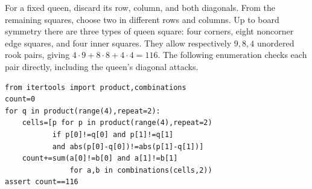 For a fixed queen, discard its row, column, and both diagonals. From the remaining squares, choose two in different rows and columns. Up to board symmetry there are three types of queen square: four corners, eight noncorner edge squares, and four inner squares. They allow respectively $9,8,4$ unordered rook pairs, giving $4\cdot9+8\cdot8+4\cdot4=\boxed{116}$. The following enumeration checks each pair directly, including the queen's diagonal attacks.\begin{verbatim}
from itertools import product,combinations
count=0
for q in product(range(4),repeat=2):
    cells=[p for p in product(range(4),repeat=2)
           if p[0]!=q[0] and p[1]!=q[1]
           and abs(p[0]-q[0])!=abs(p[1]-q[1])]
    count+=sum(a[0]!=b[0] and a[1]!=b[1]
               for a,b in combinations(cells,2))
assert count==116
\end{verbatim}
